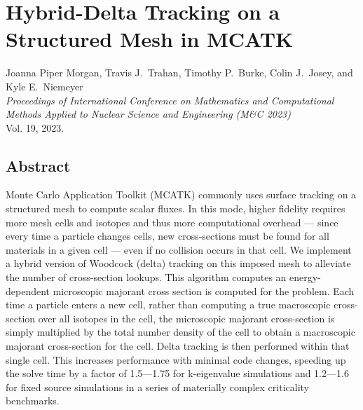 \renewcommand{\TheTitle}{Hybrid-Delta Tracking on a Structured Mesh in MCATK}
\renewcommand{\TheAuthors}{%
Joanna Piper Morgan,
Travis J.~Trahan,
Timothy P.~Burke,
Colin J.~Josey, 
and Kyle E.~Niemeyer}
  
\renewcommand{\TheAddress}{%
    \textit{Proceedings of International Conference on Mathematics and Computational Methods Applied to Nuclear Science and Engineering (M\&C 2023)} \\
    Vol. 19, 2023. \\
    \arxiv{2306.07847}
}

\chapter{\TheTitle}
\label{chapter:mcatk_paper}

\vspace{1em}
\TheAuthors\\
\TheAddress




\section*{Abstract}
Monte Carlo Application Toolkit (MCATK) commonly uses surface tracking on a structured mesh to compute scalar fluxes. In this mode, higher fidelity requires more mesh cells and isotopes and thus more computational overhead --- since every time a particle changes cells, new cross-sections must be found for all materials in a given cell --- even if no collision occurs in that cell. We implement a hybrid version of Woodcock (delta) tracking on this imposed mesh to alleviate the number of cross-section lookups. This algorithm computes an energy-dependent microscopic majorant cross section is computed for the problem. Each time a particle enters a new cell, rather than computing a true macroscopic cross-section over all isotopes in the cell, the microscopic majorant cross-section is simply multiplied by the total number density of the cell to obtain a macroscopic majorant cross-section for the cell. Delta tracking is then performed within that single cell. This increases performance with minimal code changes, speeding up the solve time by a factor of 1.5---1.75 for k-eigenvalue simulations and 1.2---1.6 for fixed source simulations in a series of materially complex criticality benchmarks.

